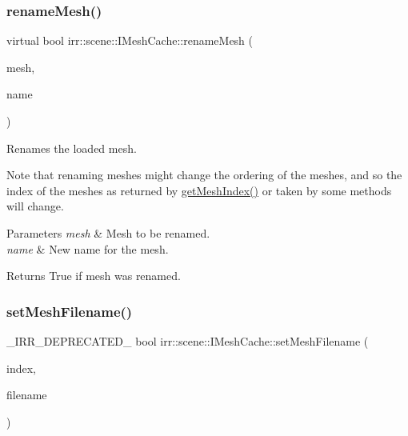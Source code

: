 \subsubsection{\texorpdfstring{rename\+Mesh()}{renameMesh()}\hspace{0.1cm}{\footnotesize\ttfamily [2/2]}}
{\footnotesize\ttfamily virtual bool irr\+::scene\+::\+I\+Mesh\+Cache\+::rename\+Mesh (\begin{DoxyParamCaption}\item[{const \hyperlink{classirr_1_1scene_1_1IMesh}{I\+Mesh} $\ast$const}]{mesh,  }\item[{const \hyperlink{namespaceirr_1_1io_ab1bdc45edb3f94d8319c02bc0f840ee1}{io\+::path} \&}]{name }\end{DoxyParamCaption})\hspace{0.3cm}{\ttfamily [pure virtual]}}



Renames the loaded mesh. 

Note that renaming meshes might change the ordering of the meshes, and so the index of the meshes as returned by \hyperlink{classirr_1_1scene_1_1IMeshCache_a2b3512bd3ff11d0b290fa5d2d580eb54}{get\+Mesh\+Index()} or taken by some methods will change. 
\begin{DoxyParams}{Parameters}
{\em mesh} & Mesh to be renamed. \\
\hline
{\em name} & New name for the mesh. \\
\hline
\end{DoxyParams}
\begin{DoxyReturn}{Returns}
True if mesh was renamed. 
\end{DoxyReturn}
\mbox{\label{classirr_1_1scene_1_1IMeshCache_a5b87031dbfdb70a59c00a1b892b74c3d}} 
\subsubsection{\texorpdfstring{set\+Mesh\+Filename()}{setMeshFilename()}\hspace{0.1cm}{\footnotesize\ttfamily [1/2]}}
{\footnotesize\ttfamily \+\_\+\+I\+R\+R\+\_\+\+D\+E\+P\+R\+E\+C\+A\+T\+E\+D\+\_\+ bool irr\+::scene\+::\+I\+Mesh\+Cache\+::set\+Mesh\+Filename (\begin{DoxyParamCaption}\item[{\hyperlink{namespaceirr_a0416a53257075833e7002efd0a18e804}{u32}}]{index,  }\item[{const \hyperlink{namespaceirr_1_1io_ab1bdc45edb3f94d8319c02bc0f840ee1}{io\+::path} \&}]{filename }\end{DoxyParamCaption})\hspace{0.3cm}{\ttfamily [inline]}}




